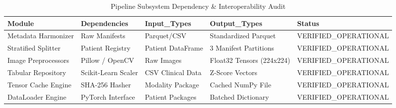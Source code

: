 \begin{table}
\caption{Pipeline Subsystem Dependency & Interoperability Audit}
\begin{tabular}{lllll}
\toprule
Module & Dependencies & Input_Types & Output_Types & Status \\
\midrule
Metadata Harmonizer & Raw Manifests & Parquet/CSV & Standardized Parquet & VERIFIED_OPERATIONAL \\
Stratified Splitter & Patient Registry & Patient DataFrame & 3 Manifest Partitions & VERIFIED_OPERATIONAL \\
Image Preprocessors & Pillow / OpenCV & Raw Images & Float32 Tensors (224x224) & VERIFIED_OPERATIONAL \\
Tabular Repository & Scikit-Learn Scaler & CSV Clinical Data & Z-Score Vectors & VERIFIED_OPERATIONAL \\
Tensor Cache Engine & SHA-256 Hasher & Modality Package & Cached NumPy File & VERIFIED_OPERATIONAL \\
DataLoader Engine & PyTorch Interface & Patient Packages & Batched Dictionary & VERIFIED_OPERATIONAL \\
\bottomrule
\end{tabular}
\end{table}
